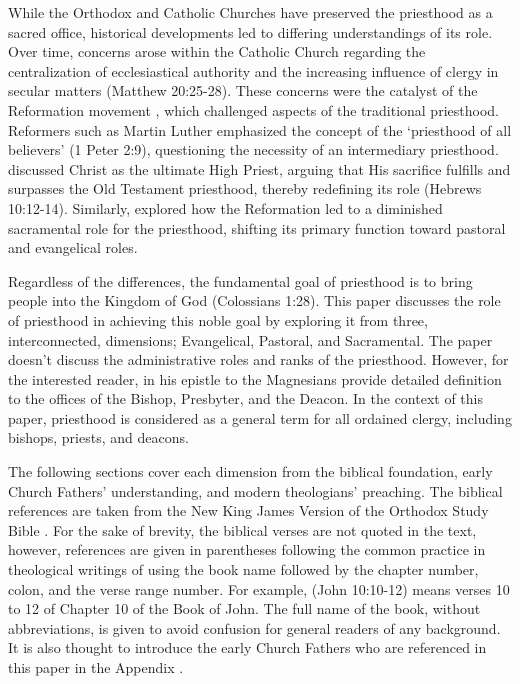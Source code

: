 \documentclass[12pt,doc]{apa7}   	%
\begin{document}
While the Orthodox and Catholic Churches have preserved the priesthood as a sacred office, historical developments led to differing understandings of its role. Over time, concerns arose within the Catholic Church regarding the centralization of ecclesiastical authority and the increasing influence of clergy in secular matters (Matthew 20:25-28). These concerns were the catalyst of the Reformation movement \citep{reformation_lutzer}, which challenged aspects of the traditional priesthood.  Reformers such as Martin Luther \citep{reformation_lull_nelson} emphasized the concept of the ‘priesthood of all believers’ (1 Peter 2:9), questioning the necessity of an intermediary priesthood. \citet{hebrews_wright} discussed Christ as the ultimate High Priest, arguing that His sacrifice fulfills and surpasses the Old Testament priesthood, thereby redefining its role (Hebrews 10:12-14). Similarly, \citet{reformation_macCulloch} explored how the Reformation led to a diminished sacramental role for the priesthood, shifting its primary function toward pastoral and evangelical roles.

Regardless of the differences, the fundamental goal of priesthood is to bring people into the Kingdom of God (Colossians 1:28). This paper discusses the role of priesthood in achieving this noble goal by exploring it from three, interconnected, dimensions; Evangelical, Pastoral, and Sacramental.  The paper doesn't discuss the administrative roles and ranks of the priesthood.  However, for the interested reader, \citet{epistles_ignatius} in his epistle to the Magnesians provide detailed definition to the offices of the Bishop, Presbyter, and the Deacon.  In the context of this paper, priesthood is considered as a general term for all ordained clergy, including bishops, priests, and deacons.

The following sections cover each dimension from the biblical foundation, early Church Fathers' understanding, and modern theologians' preaching.  The biblical references are taken from the New King James Version of the Orthodox Study Bible \citep{nelson_nkjv}.  For the sake of brevity, the biblical verses are not quoted in the text, however, references are given in parentheses following the common practice in theological writings of using the book name followed by the chapter number, colon, and the verse range number.  For example, (John 10:10-12) means verses 10 to 12 of Chapter 10 of the Book of John.  The full name of the book, without abbreviations, is given to avoid confusion for general readers of any background.  It is also thought to introduce the early Church Fathers who are referenced in this paper in the Appendix \citep{early_church_akin}.
\end{document}
